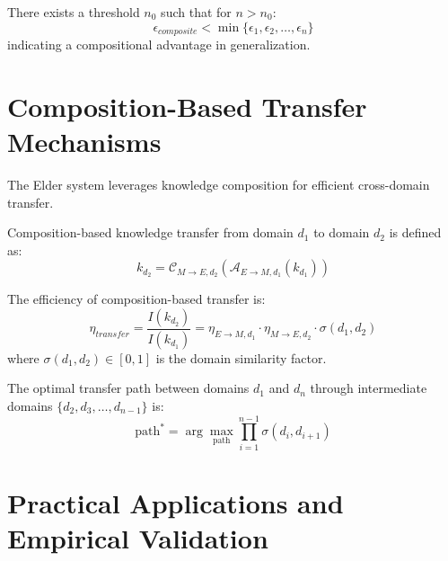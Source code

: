\begin{corollary}
There exists a threshold $n_0$ such that for $n > n_0$:
\begin{equation}
\epsilon_{composite} < \min\{\epsilon_1, \epsilon_2, \ldots, \epsilon_n\}
\end{equation}
indicating a compositional advantage in generalization.
\end{corollary}

\section{Composition-Based Transfer Mechanisms}

The Elder system leverages knowledge composition for efficient cross-domain transfer.

\begin{definition}
Composition-based knowledge transfer from domain $d_1$ to domain $d_2$ is defined as:
\begin{equation}
k_{d_2} = \mathcal{C}_{M \rightarrow E,d_2}\left(\mathcal{A}_{E \rightarrow M,d_1}(k_{d_1})\right)
\end{equation}
\end{definition}

\begin{theorem}
The efficiency of composition-based transfer is:
\begin{equation}
\eta_{transfer} = \frac{I(k_{d_2})}{I(k_{d_1})} = \eta_{E \rightarrow M,d_1} \cdot \eta_{M \rightarrow E,d_2} \cdot \sigma(d_1, d_2)
\end{equation}
where $\sigma(d_1, d_2) \in [0, 1]$ is the domain similarity factor.
\end{theorem}

\begin{theorem}
The optimal transfer path between domains $d_1$ and $d_n$ through intermediate domains $\{d_2, d_3, \ldots, d_{n-1}\}$ is:
\begin{equation}
\text{path}^* = \arg\max_{\text{path}} \prod_{i=1}^{n-1} \sigma(d_i, d_{i+1})
\end{equation}
\end{theorem}

\section{Practical Applications and Empirical Validation}


